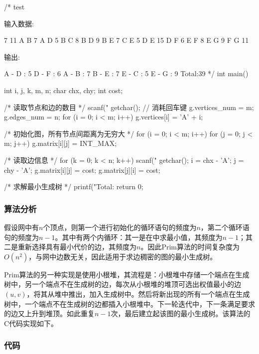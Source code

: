 \begin{Codex}[label=mgraph_prim1.c]
/* test

输入数据:

7 11
A B 7
A D 5
B C 8
B D 9
B E 7
C E 5
D E 15
D F 6
E F 8
E G 9
F G 11

输出:

A - D : 5
D - F : 6
A - B : 7
B - E : 7
E - C : 5
E - G : 9
Total:39
*/
int main() {
    int i, j, k, m, n;
    char chx, chy;
    int cost;

    /* 读取节点和边的数目 */
    scanf("%
    getchar(); // 消耗回车键
    g.vertices_num = m;
    g.edges_num = n;
    for (i = 0; i < m; i++) g.vertices[i] = 'A' + i;

    /* 初始化图，所有节点间距离为无穷大 */
    for (i = 0; i < m; i++) {
        for (j = 0; j < m; j++) {
            g.matrix[i][j] = INT_MAX;
        }
    }

    /* 读取边信息 */
    for (k = 0; k < n; k++) {
        scanf("%
        getchar();
        i = chx - 'A';
        j = chy - 'A';
        g.matrix[i][j] = cost;
        g.matrix[j][i] = cost;
    }

    /* 求解最小生成树 */
    printf("Total:%
    return 0;
}
\end{Codex}

\subsubsection{算法分析}
假设网中有$n$个顶点，则第一个进行初始化的循环语句的频度为$n$，第二个循环语句的频度为$n-1$。其中有两个内循环：其一是在中求最小值，其频度为$n-1$；其二是重新选择具有最小代价的边，其频度为$n$。因此Prim算法的时间复杂度为$O(n^2)$，与网中边数无关，因此适用于求边稠密的图的最小生成树。

Prim算法的另一种实现是使用小根堆，其流程是：小根堆中存储一个端点在生成树中，另一个端点不在生成树的边，每次从小根堆的堆顶可选出权值最小的边$(u, v)$，将其从堆中推出，加入生成树中。然后将新出现的所有一个端点在生成树中，一个端点不在生成树的边都插入小根堆中。下一轮迭代中，下一条满足要求的边又上升到堆顶。如此重复$n-1$次，最后建立起该图的最小生成树。该算法的C代码实现如下。

\subsubsection{代码}

